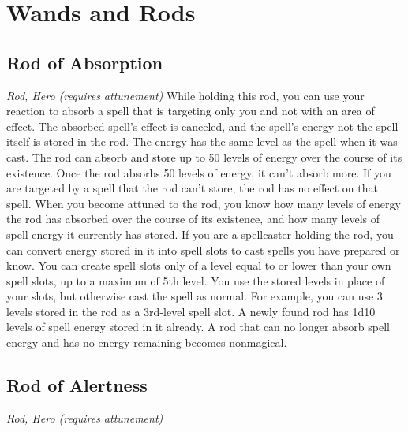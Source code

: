 \section{Wands and Rods}\label{mi:wands}

\subsection{Rod of Absorption}
\textit{Rod, Hero (requires attunement)}
While holding this rod, you can use your reaction to absorb a spell that is targeting only you and not with an area of effect. The absorbed spell's effect is canceled, and the spell's energy-not the spell itself-is stored in the rod. The energy has the same level as the spell when it was cast. The rod can absorb and store up to 50 levels of energy over the course of its existence. Once the rod absorbs 50 levels of energy, it can't absorb more. If you are targeted by a spell that the rod can't store, the rod has no effect on that spell.
When you become attuned to the rod, you know how many levels of energy the rod has absorbed over the course of its existence, and how many levels of spell energy it currently has stored.
If you are a spellcaster holding the rod, you can convert energy stored in it into spell slots to cast spells you have prepared or know. You can create spell slots only of a level equal to or lower than your own spell slots, up to a maximum of 5th level. You use the stored levels in place of your slots, but otherwise cast the spell as normal. For example, you can use 3 levels stored in the rod as a 3rd-level spell slot.
A newly found rod has 1d10 levels of spell energy stored in it already. A rod that can no longer absorb spell energy and has no energy remaining becomes nonmagical.

\subsection{Rod of Alertness}
\textit{Rod, Hero (requires attunement)}

